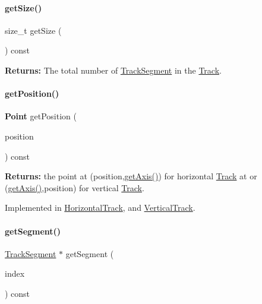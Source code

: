 \paragraph{\texorpdfstring{get\+Size()}{getSize()}}
{\footnotesize\ttfamily size\+\_\+t get\+Size (\begin{DoxyParamCaption}{ }\end{DoxyParamCaption}) const\hspace{0.3cm}{\ttfamily [inline]}}

{\bfseries Returns\+:} The total number of \hyperlink{classKite_1_1TrackSegment}{Track\+Segment} in the \hyperlink{classKite_1_1Track}{Track}. \mbox{\label{classKite_1_1Track_a2a033f90e528d3d07aa33694dd733200}} 
\paragraph{\texorpdfstring{get\+Position()}{getPosition()}}
{\footnotesize\ttfamily \textbf{ Point} get\+Position (\begin{DoxyParamCaption}\item[{\textbf{ Db\+U\+::\+Unit}}]{position }\end{DoxyParamCaption}) const\hspace{0.3cm}{\ttfamily [pure virtual]}}

{\bfseries Returns\+:} the point at {\ttfamily }(position,\hyperlink{classKite_1_1Track_ab5b5aaa5b318369feee6003dbad039c2}{get\+Axis()}) for horizontal \hyperlink{classKite_1_1Track}{Track} at or {\ttfamily }(\hyperlink{classKite_1_1Track_ab5b5aaa5b318369feee6003dbad039c2}{get\+Axis()},position) for vertical \hyperlink{classKite_1_1Track}{Track}. 

Implemented in \hyperlink{classKite_1_1HorizontalTrack_a6ab4f8026e4500918aa8721f1199f8b6}{Horizontal\+Track}, and \hyperlink{classKite_1_1VerticalTrack_a6ab4f8026e4500918aa8721f1199f8b6}{Vertical\+Track}.

\mbox{\label{classKite_1_1Track_acb93796a96c9737133fb5d90837ab81d}} 
\paragraph{\texorpdfstring{get\+Segment()}{getSegment()}\hspace{0.1cm}{\footnotesize\ttfamily [1/2]}}
{\footnotesize\ttfamily \hyperlink{classKite_1_1TrackSegment}{Track\+Segment} $\ast$ get\+Segment (\begin{DoxyParamCaption}\item[{size\+\_\+t}]{index }\end{DoxyParamCaption}) const}


